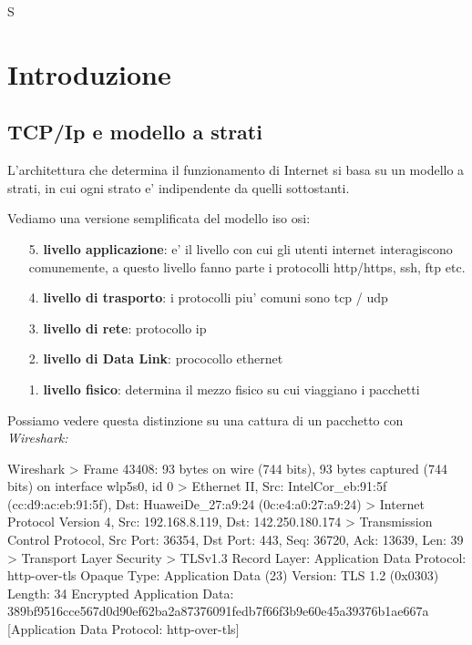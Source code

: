 S
\chapter{Introduzione}


\section{TCP/Ip e modello a strati}



L'architettura che determina il funzionamento di Internet si basa su un modello a strati, in cui ogni strato e' indipendente da quelli sottostanti.

Vediamo una versione semplificata del modello iso osi:

\begin{enumerate}
    \item[5.] \textbf{livello applicazione}: e' il livello con cui gli utenti internet interagiscono comunemente, a questo livello fanno parte i protocolli http/https, ssh, ftp etc. 
    \item[4.] \textbf{livello di trasporto}: i protocolli piu' comuni sono tcp / udp
    \item[3.] \textbf{livello di rete}: protocollo ip
    \item[2.] \textbf{livello di Data Link}: prococollo ethernet
    \item[1.] \textbf{livello fisico}: determina il mezzo fisico su cui viaggiano i pacchetti
\end{enumerate}

Possiamo vedere questa distinzione su una cattura di un pacchetto con \it{Wireshark}:

\begin{bashcode}{Wireshark}{}
> Frame 43408: 93 bytes on wire (744 bits), 93 bytes captured (744 bits) on interface wlp5s0, id 0
> Ethernet II, Src: IntelCor_eb:91:5f (cc:d9:ac:eb:91:5f), Dst: HuaweiDe_27:a9:24 (0c:e4:a0:27:a9:24)
> Internet Protocol Version 4, Src: 192.168.8.119, Dst: 142.250.180.174
> Transmission Control Protocol, Src Port: 36354, Dst Port: 443, Seq: 36720, Ack: 13639, Len: 39
> Transport Layer Security
    > TLSv1.3 Record Layer: Application Data Protocol: http-over-tls
            Opaque Type: Application Data (23)
            Version: TLS 1.2 (0x0303)
            Length: 34
            Encrypted Application Data: 389bf9516cce567d0d90ef62ba2a87376091fedb7f66f3b9e60e45a39376b1ae667a
            [Application Data Protocol: http-over-tls]
\end{bashcode}

